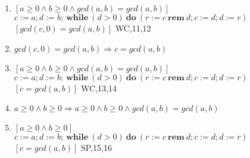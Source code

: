 \documentclass[a4papers]{ctexart}
\newcommand{\brem}{\ \boldsymbol{rem}\ }
\newcommand{\bwhile}{\ \boldsymbol{while}\ }
\newcommand{\bdo}{\ \boldsymbol{do}\ }
\begin{document}
\begin{enumerate}
    \item $[a\ge0 \wedge b \ge 0 \wedge gcd(a,b)=gcd(a,b) ]$\\
           $c:=a;d:=b;\bwhile(d>0) \bdo (r:=c \brem d;c:=d;d:=r)$\\
            $[ gcd(c,0)=gcd(a,b) ]$                                 \hfill WC,11,12
    \item $gcd(c,0)=gcd(a,b) \Rightarrow c=gcd(a,b)$                  
    \item $[a\ge0 \wedge b \ge 0 \wedge gcd(a,b)=gcd(a,b) ]$\\
          $c:=a;d:=b;\bwhile(d>0) \bdo (r:=c \brem d;c:=d;d:=r)$\\ 
          $[c=gcd(a,b) ]$                                           \hfill WC,13,14
    \item $a\ge0 \wedge b \ge 0 \Rightarrow a\ge0 \wedge b \ge 0 \wedge gcd(a,b)=gcd(a,b)$
    \item $[a\ge0 \wedge b \ge 0  ]$\\
          $c:=a;d:=b;\bwhile(d>0) \bdo (r:=c \brem d;c:=d;d:=r)$\\ 
          $[c=gcd(a,b) ]$                                           \hfill SP,15,16
\end{enumerate}
\end{document}

